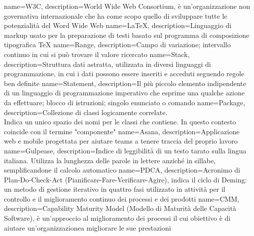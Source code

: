  {
	name=W3C,
	description={World Wide Web Consortium, è un'organizzazione non governativa internazionale che ha come scopo quello di
	sviluppare tutte le potenzialità del Word Wide Web}
}
 {
	name=LaTeX,
	description={Linguaggio di markup usato per la preparazione di testi basato sul programma di composizione tipografica
	TeX}
}
 {
	name=Range,
	description={Campo di variazione; intervallo continuo in cui si può trovare il valore ricercato}
}
 {
	name=Stack,
	description={Struttura dati astratta, utilizzata in diversi linguaggi di programmazione, in cui i dati possono essere
	inseriti e acceduti seguendo regole ben definite}
}
 {
	name=Statement,
	description={Il più piccolo elemento indipendente di un linguaggio di programmazione imperativo che esprime una qualche
	azione da effettuare; blocco di istruzioni; singolo enunciato o comando}
}
 {
	name=Package,
	description={Collezione di classi logicamente correlate.\\
	Indica un unico spazio dei nomi per le classi che contiene. In questo contesto coincide con il termine "componente"}
}
 {
	name=Asana,
	description={Applicazione web e mobile progettata per aiutare teams a tenere traccia del proprio lavoro}
}
 {
	name=Gulpease,
	description={Indice di leggibilità di un testo tarato sulla lingua italiana. Utilizza la lunghezza delle parole in
	lettere anziché in sillabe, semplificandone il calcolo automatico}
}
 {
	name=PDCA,
	description={Acronimo di Plan-Do-Check-Act (Pianificare-Fare-Verificare-Agire), indica il ciclo di Deming: un metodo di
	gestione iterativo in quattro fasi utilizzato in attività per il controllo e il miglioramento continuo dei processi e
	dei prodotti}
}
 {
	name=CMM,
	description={Capability Maturity Model (Modello di Maturità delle Capacità Software), è un'approccio al miglioramento
	dei processi il cui obiettivo è di aiutare un'organizzazionea migliorare le sue prestazioni}
}

